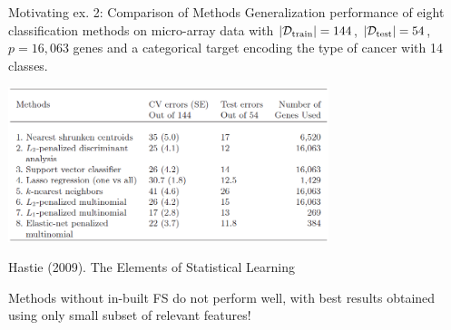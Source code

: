\documentclass[11pt,compress,t,notes=noshow, xcolor=table]{beamer}
\begin{document}
  \begin{vbframe}{Motivating ex. 2: Comparison of Methods}
  Generalization performance of eight classification methods on micro-array data with $| \mathcal{D}_{\text{train}} | = 144$, $| \mathcal{D}_{\text{test}} | = 54$, $p=16, 063$ genes and a categorical target encoding the type of cancer with 14 classes.
\vspace{0.25cm}
  \begin{center}
  \includegraphics[width=0.7\textwidth]{figure_man/tibshirani_tab_18_1.png}

  \footnotesize{Hastie (2009). The Elements of Statistical Learning}
  \end{center}
  Methods without in-built FS do not perform well, with best results obtained using only small subset of relevant features!
  \end{vbframe}
\end{document}
